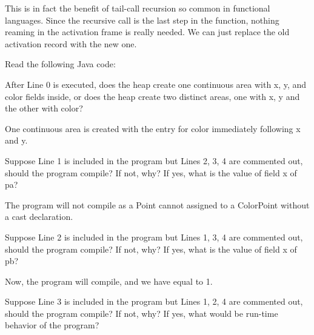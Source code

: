 \documentclass[12pt,letterpaper]{hmcpset}
\begin{document}
\begin{solution}
This is in fact the benefit of tail-call recursion so common in functional languages.  Since the recursive call is the last step in the function, nothing reaming in the activation frame is really needed.  We can just replace the old activation record with the new one.
\end{solution}

\begin{problem}[5]
Read the following Java code:
\end{problem}

\begin{problem}[5a]
After Line 0 is executed, does the heap create one continuous area with x, y, and color fields inside, or does the heap create two distinct areas, one with x, y and the other with color?
\end{problem}

\begin{solution}
One continuous area is created with the entry for color immediately following x and y.
\end{solution}

\begin{problem}[5b]
Suppose Line 1 is included in the program but Lines 2, 3, 4 are commented out, should the program compile? If not, why? If yes, what is the value of field x of pa? 
\end{problem}

\begin{solution}
The program will not compile as a Point cannot assigned to a ColorPoint without a cast declaration.
\end{solution}

\begin{problem}[5c]
Suppose Line 2 is included in the program but Lines 1, 3, 4 are commented out, should the program compile? If not, why? If yes, what is the value of field x of pb?
\end{problem}

\begin{solution}
Now, the program will compile, and we have  equal to 1.
\end{solution}

\begin{problem}[5d]
Suppose Line 3 is included in the program but Lines 1, 2, 4 are commented out, should the program compile? If not, why? If yes, what would be run-time behavior of the program?
\end{problem}
\end{document}
